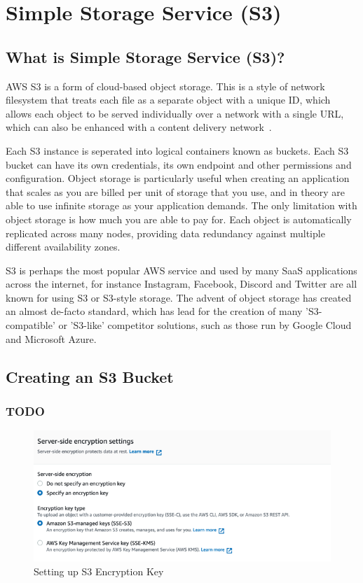 \chapter{Simple Storage Service (S3)}\label{ch:simple-storage-service}

\section{What is Simple Storage Service (S3)?}
AWS S3 is a form of cloud-based object storage.
This is a style of network filesystem that treats each file as a separate object with a unique ID, which allows each
object to be served individually over a network with a single URL, which can also be enhanced with a content delivery
network~\parencite{amazon2022cloud}.

Each S3 instance is seperated into logical containers known as buckets.
Each S3 bucket can have its own credentials, its own endpoint and other permissions and configuration.
Object storage is particularly useful when creating an application that scales as you are billed per unit of storage
that you use, and in theory are able to use infinite storage as your application demands.
The only limitation with object storage is how much you are able to pay for.
Each object is automatically replicated across many nodes, providing data redundancy against multiple different
availability zones.

S3 is perhaps the most popular AWS service and used by many SaaS applications across the internet, for instance
Instagram, Facebook, Discord and Twitter are all known for using S3 or S3-style storage.
The advent of object storage has created an almost de-facto standard, which has lead for the creation of many
'S3-compatible' or 'S3-like' competitor solutions, such as those run by Google Cloud and Microsoft Azure.

\section{Creating an S3 Bucket}

\subsection{TODO}

\begin{figure}
    \centering
    \includegraphics[width=\textwidth]{resources/s3/s3_encryption.PNG}
    \caption{Setting up S3 Encryption Key}
    \label{fig:s3-image-2}
\end{figure}

